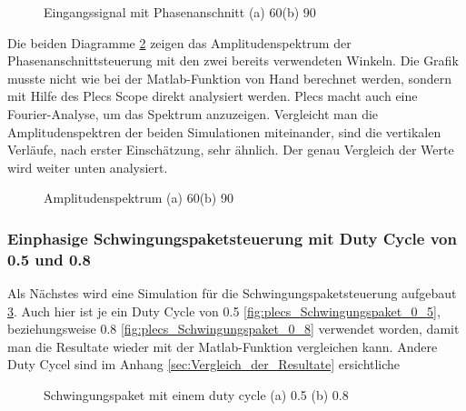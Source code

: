 \begin{figure}[ht!]
	\centering
	\qquad
	\caption{Eingangssignal mit Phasenanschnitt (a) 60\textdegree (b) 90\textdegree}
	\label{fig:Eingangssignal simuliert mit Plecs}
\end{figure}

\newpage

Die beiden Diagramme \ref{fig:plecs_Amplitudenspektrum} zeigen das Amplitudenspektrum der Phasenanschnittsteuerung mit den zwei bereits verwendeten Winkeln. Die Grafik musste nicht wie bei der Matlab-Funktion von Hand berechnet werden, sondern mit Hilfe des Plecs Scope direkt analysiert werden. Plecs macht auch eine Fourier-Analyse, um das Spektrum anzuzeigen. Vergleicht man die Amplitudenspektren der beiden Simulationen miteinander, sind die vertikalen Verläufe, nach erster Einschätzung, sehr ähnlich. Der genau Vergleich der Werte wird weiter unten analysiert.   
     
\begin{figure}[ht!]
	\centering
	\qquad
	\caption{Amplitudenspektrum (a) 60\textdegree (b) 90\textdegree}
	\label{fig:plecs_Amplitudenspektrum}
\end{figure}

\subsubsection{Einphasige Schwingungspaketsteuerung mit Duty Cycle von 0.5 und 0.8}

Als Nächstes wird eine Simulation für die Schwingungspaketsteuerung aufgebaut \ref{fig:plecs_Schwingungspakete}. Auch hier ist je ein Duty Cycle von 0.5 \ref{fig:plecs_Schwingungspaket_0_5}, beziehungsweise 0.8 \ref{fig:plecs_Schwingungspaket_0_8} verwendet worden, damit man die Resultate wieder mit der Matlab-Funktion vergleichen kann. Andere Duty Cycel sind im Anhang \ref{sec:Vergleich_der_Resultate} ersichtliche  
\begin{figure}[ht!]
	\centering
	\qquad
	\caption{Schwingungspaket mit einem duty cycle (a) 0.5 (b) 0.8}
	\label{fig:plecs_Schwingungspakete}
\end{figure}

